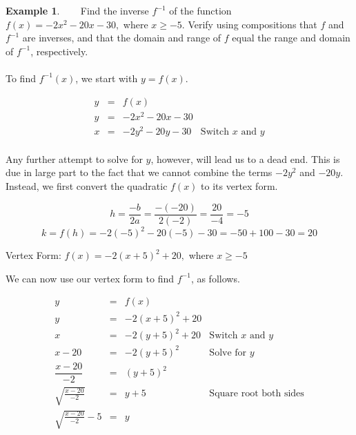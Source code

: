 \documentclass[11pt]{book}
\theoremstyle{definition}  %
\newtheorem{example}{Example}[chapter]
\begin{document}
\begin{example}~~~  Find the inverse $f^{-1}$ of the function\\ $f(x) = -2x^2-20x-30,$ where $x\geq -5$.  Verify using compositions that $f$ and $f^{-1}$ are inverses, and that the domain and range of $f$ equal the range and domain of $f^{-1}$, respectively.\\
~\\
To find $f^{-1}(x)$, we start with $y=f(x)$.

\[ \begin{array}{rclr}
y & = & f(x) & \\ [5pt]
y & = &  -2x^2-20x-30 & \\ [7pt]
x & = & -2y^2-20y-30 & \mbox{Switch $x$ and $y$} \\ [3pt]
\end{array} \]

Any further attempt to solve for $y$, however, will lead us to a dead end.  This is due in large part to the fact that we cannot combine the terms $-2y^2$ and $-20y$.  Instead, we first convert the quadratic $f(x)$ to its vertex form.

\newpage

$$h=\frac{-b}{2a}=\frac{-(-20)}{2(-2)}=\frac{20}{-4}=-5$$
$$k=f(h)=-2(-5)^2-20(-5)-30=-50+100-30=20$$
\begin{center}
Vertex Form: $f(x)=-2(x+5)^2+20,$ where $x\geq -5$
\end{center}
We can now use our vertex form to find $f^{-1}$, as follows.

\[ \begin{array}{rclr}
y & = & f(x) & \\ [5pt]
y & = &  -2(x+5)^2+20 & \\ [7pt]
x & = & -2(y+5)^2+20 & \mbox{Switch $x$ and $y$} \\ [3pt]
x-20 & = & -2(y+5)^2 & \mbox{Solve for $y$} \\ [3pt]
\dfrac{x-20}{-2} & = & (y+5)^2 & \\
\sqrt{\frac{x-20}{-2}} & = & y+5 & \mbox{Square root both sides} \\ [3pt]
\sqrt{\frac{x-20}{-2}}-5 & = & y & \\
\end{array} \]


\end{example}
\end{document}
